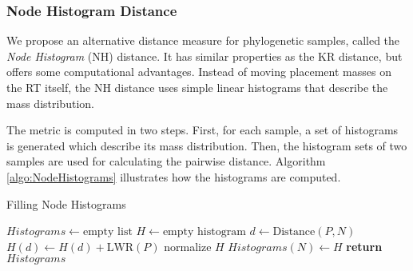 

\subsubsection{Node Histogram Distance}
\label{sec:Postprocessing:sub:DistanceMeasures:sub:NHD}



We propose an alternative distance measure for phylogenetic samples, called the \emph{Node Histogram} (NH) distance.
It has similar properties as the KR distance, but offers some computational advantages.
Instead of moving placement masses on the \ac{RT} itself, the NH distance uses simple linear histograms
that describe the mass distribution.

The metric  is computed in two steps.
First, for each sample, a set of histograms is generated which describe its mass distribution.
Then, the histogram sets of two samples are used for calculating the pairwise distance.
Algorithm \ref{algo:NodeHistograms} illustrates how the histograms are computed.

\begin{algorithm}
\caption{Filling Node Histograms}\label{algo:NodeHistograms}
\begin{algorithmic}[1]
    \State $Histograms \gets \text{empty list}$
        \State $H \gets \text{empty histogram}$
                \State $d \gets \text{Distance}( P, N ) $
                \State $ H(d) \gets H(d) + \text{LWR}(P) $
            \EndFor
        \EndFor
        \State normalize $H$
        \State $Histograms(N) \gets H$
    \EndFor
    \State \textbf{return} $Histograms$
\end{algorithmic}
\end{algorithm}

